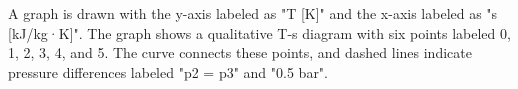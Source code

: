 A graph is drawn with the y-axis labeled as "T [K]" and the x-axis labeled as "s [kJ/kg·K]". The graph shows a qualitative T-s diagram with six points labeled 0, 1, 2, 3, 4, and 5. The curve connects these points, and dashed lines indicate pressure differences labeled "p2 = p3" and "0.5 bar".